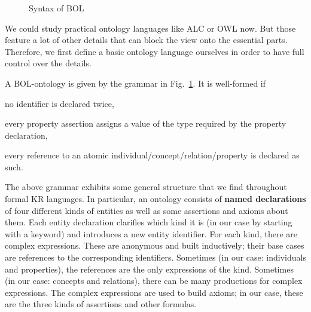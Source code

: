 \begin{figure}[hbt]
\begin{commgrammar}
\\
\\
\\
\\
\\
\\
\\
\\
\\
\\
\end{commgrammar}
\caption{Syntax of BOL}\label{fig:bol}
\end{figure}

\clearpage


We could study practical ontology languages like ALC or OWL now.
But those feature a lot of other details that can block the view onto the essential parts.
Therefore, we first define a basic ontology language ourselves in order to have full control over the details.

\begin{definition}\label{def:bolsyn}
A BOL-ontology is given by the grammar in Fig.~\ref{fig:bol}.
It is well-formed if
\begin{compactitem}
 \item no identifier is declared twice,
 \item every property assertion assigns a value of the type required by the property declaration,
 \item every reference to an atomic individual/concept/relation/property is declared as such.
\end{compactitem}
\end{definition}

The above grammar exhibits some general structure that we find throughout formal KR languages.
In particular, an ontology consists of \textbf{named declarations} of four different kinds of entities as well as some assertions and axioms about them.
Each entity declaration clarifies which kind it is (in our case by starting with a keyword) and introduces a new entity identifier.
For each kind, there are complex expressions.
These are anonymous and built inductively; their base cases are references to the corresponding identifiers.
Sometimes (in our case: individuals and properties), the references are the only expressions of the kind.
Sometimes (in our case: concepts and relations), there can be many productions for complex expressions.
The complex expressions are used to build axioms; in our case, these are the three kinds of assertions and other formulas.


